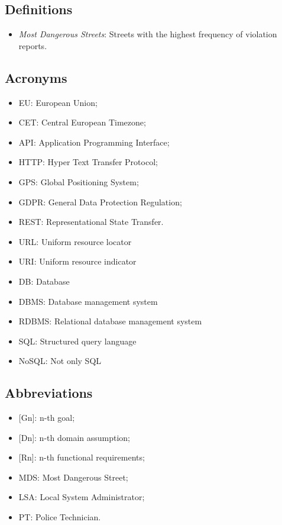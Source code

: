 \subsection{Definitions}
\begin{itemize}
  \item \textit{Most Dangerous Streets}: Streets with the highest frequency of violation reports.
\end{itemize}

\subsection{Acronyms}
\begin{itemize}
  \item EU: European Union;
  \item CET: Central European Timezone;
  \item API: Application Programming Interface;
  \item HTTP: Hyper Text Transfer Protocol;
  \item GPS: Global Positioning System;
  \item GDPR: General Data Protection Regulation;
  \item REST: Representational State Transfer.
  \item URL: Uniform resource locator
  \item URI: Uniform resource indicator
  \item DB: Database
  \item DBMS: Database management system
  \item RDBMS: Relational database management system
  \item SQL: Structured query language
  \item NoSQL: Not only SQL
\end{itemize}

\subsection{Abbreviations}
\begin{itemize}
  \item {[Gn]}: n-th goal;
  \item {[Dn]}: n-th domain assumption;
  \item {[Rn]}: n-th functional requirements;
  \item MDS: Most Dangerous Street;
  \item LSA: Local System Administrator;
  \item PT: Police Technician.
\end{itemize}
